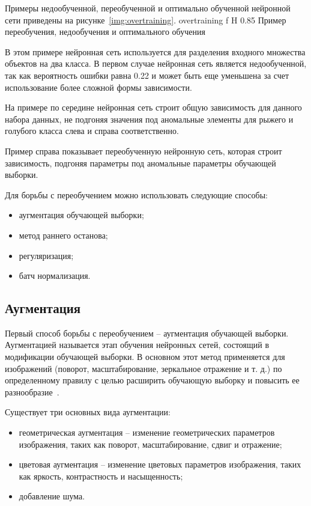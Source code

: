 Примеры недообученной, переобученной и оптимально обученной нейронной сети приведены на рисунке~\ref{img:overtraining}.
{overtraining} %
{f} %
{H} %
{0.85\textwidth} %
{Пример переобучения, недообучения и оптимального обучения} %

В этом примере нейронная сеть используется для разделения входного множества объектов на два класса. В первом случае нейронная сеть является недообученной, так как вероятность ошибки равна 0.22 и может быть еще уменьшена за счет использование более сложной формы зависимости.

На примере по середине нейронная сеть строит общую зависимость для данного набора данных, не подгоняя значения под аномальные элементы для рыжего и голубого класса слева и справа соответственно.

Пример справа показывает переобученную нейронную сеть, которая строит зависимость, подгоняя параметры под аномальные параметры обучающей выборки.

Для борьбы с переобучением можно использовать следующие способы:
\begin{itemize}
	\item аугментация обучающей выборки;
	\item метод раннего останова;
	\item регуляризация;
	\item батч нормализация.
\end{itemize}

\subsection{Аугментация}
Первый способ борьбы с переобучением -- аугментация обучающей выборки. Аугментацией называется этап обучения нейронных сетей, состоящий в модификации обучающей выборки. 
В основном этот метод применяется для изображений (поворот, масштабирование, зеркальное отражение и т. д.) по определенному правилу с целью расширить обучающую выборку и повысить ее разнообразие~\cite{augmentation}.

Существует три основных вида аугментации:
\begin{itemize}
	\item геометрическая аугментация -- изменение геометрических параметров изображения, таких как поворот, масштабирование, сдвиг и отражение;
	\item цветовая аугментация -- изменение цветовых параметров изображения, таких как яркость, контрастность и насыщенность;
	\item добавление шума.
\end{itemize}

